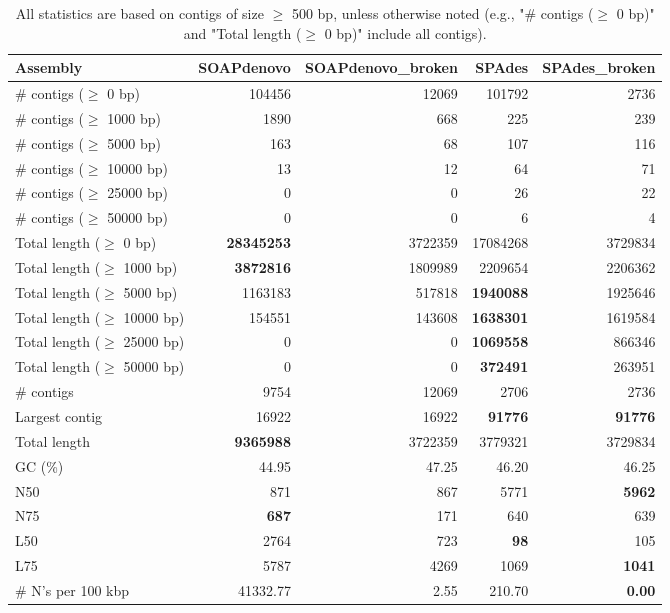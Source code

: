 \documentclass[12pt,a4paper]{article}
\begin{document}
\begin{table}[ht]
\begin{center}
\caption{All statistics are based on contigs of size $\geq$ 500 bp, unless otherwise noted (e.g., "\# contigs ($\geq$ 0 bp)" and "Total length ($\geq$ 0 bp)" include all contigs).}
\begin{tabular}{|l*{4}{|r}|}
\hline
Assembly & SOAPdenovo & SOAPdenovo\_broken & SPAdes & SPAdes\_broken \\ \hline
\# contigs ($\geq$ 0 bp) & 104456 & 12069 & 101792 & 2736 \\ \hline
\# contigs ($\geq$ 1000 bp) & 1890 & 668 & 225 & 239 \\ \hline
\# contigs ($\geq$ 5000 bp) & 163 & 68 & 107 & 116 \\ \hline
\# contigs ($\geq$ 10000 bp) & 13 & 12 & 64 & 71 \\ \hline
\# contigs ($\geq$ 25000 bp) & 0 & 0 & 26 & 22 \\ \hline
\# contigs ($\geq$ 50000 bp) & 0 & 0 & 6 & 4 \\ \hline
Total length ($\geq$ 0 bp) & {\bf 28345253} & 3722359 & 17084268 & 3729834 \\ \hline
Total length ($\geq$ 1000 bp) & {\bf 3872816} & 1809989 & 2209654 & 2206362 \\ \hline
Total length ($\geq$ 5000 bp) & 1163183 & 517818 & {\bf 1940088} & 1925646 \\ \hline
Total length ($\geq$ 10000 bp) & 154551 & 143608 & {\bf 1638301} & 1619584 \\ \hline
Total length ($\geq$ 25000 bp) & 0 & 0 & {\bf 1069558} & 866346 \\ \hline
Total length ($\geq$ 50000 bp) & 0 & 0 & {\bf 372491} & 263951 \\ \hline
\# contigs & 9754 & 12069 & 2706 & 2736 \\ \hline
Largest contig & 16922 & 16922 & {\bf 91776} & {\bf 91776} \\ \hline
Total length & {\bf 9365988} & 3722359 & 3779321 & 3729834 \\ \hline
GC (\%) & 44.95 & 47.25 & 46.20 & 46.25 \\ \hline
N50 & 871 & 867 & 5771 & {\bf 5962} \\ \hline
N75 & {\bf 687} & 171 & 640 & 639 \\ \hline
L50 & 2764 & 723 & {\bf 98} & 105 \\ \hline
L75 & 5787 & 4269 & 1069 & {\bf 1041} \\ \hline
\# N's per 100 kbp & 41332.77 & 2.55 & 210.70 & {\bf 0.00} \\ \hline
\end{tabular}
\end{center}
\end{table}
\end{document}
